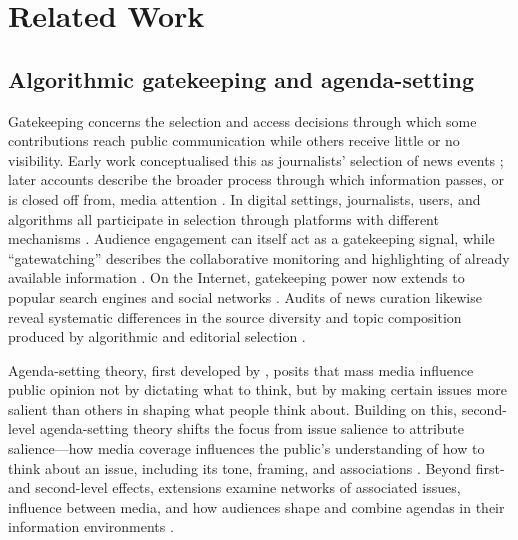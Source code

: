 \section{Related Work}

\subsection{Algorithmic gatekeeping and agenda-setting}

Gatekeeping concerns the selection and access decisions through which some contributions reach public communication while others receive little or no visibility. Early work conceptualised this as journalists' selection of news events \citep{White1950}; later accounts describe the broader process through which information passes, or is closed off from, media attention \citep{ShoemakerVos2009}. In digital settings, journalists, users, and algorithms all participate in selection through platforms with different mechanisms \citep{Wallace2018}. Audience engagement can itself act as a gatekeeping signal, while ``gatewatching'' describes the collaborative monitoring and highlighting of already available information \citep{ShoemakerVos2009,Bruns2003}. On the Internet, gatekeeping power now extends to popular search engines and social networks \citep{Nielsen2016}. Audits of news curation likewise reveal systematic differences in the source diversity and topic composition produced by algorithmic and editorial selection \citep{BandyDiakopoulos2020}.

Agenda-setting theory, first developed by \citet{McCombs1972}, posits that mass media influence public opinion not by dictating what to think, but by making certain issues more salient than others in shaping what people think about. Building on this, second-level agenda-setting theory shifts the focus from issue salience to attribute salience---how media coverage influences the public's understanding of how to think about an issue, including its tone, framing, and associations \citep{McCombs1997}. Beyond first- and second-level effects, extensions examine networks of associated issues, influence between media, and how audiences shape and combine agendas in their information environments \citep{Guo2011,Atwater1987,Kim2006,Shaw1999}.

